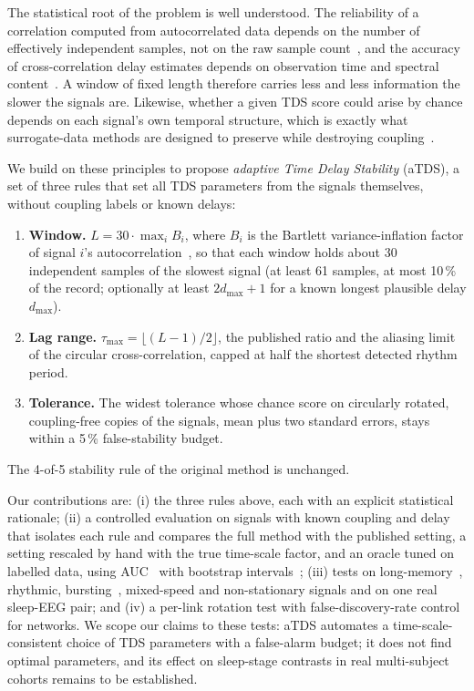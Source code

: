 \documentclass[11pt,a4paper]{article}
\begin{document}
The statistical root of the problem is well understood. The reliability of a correlation computed from autocorrelated data depends on the number of effectively independent samples, not on the raw sample count~\cite{Bartlett1946TheoreticalSpecification,Bayley1946EffectiveNumber,Pyper1998ComparisonMethods,Afyouni2019EffectiveDegrees}, and the accuracy of cross-correlation delay estimates depends on observation time and spectral content~\cite{Knapp1976GeneralizedCorrelation,Carter1987CoherenceTime}. A window of fixed length therefore carries less and less information the slower the signals are. Likewise, whether a given TDS score could arise by chance depends on each signal's own temporal structure, which is exactly what surrogate-data methods are designed to preserve while destroying coupling~\cite{Theiler1992TestingNonlinearity,Schreiber2000SurrogateTime,Lancaster2018SurrogateData}.

We build on these principles to propose \emph{adaptive Time Delay Stability} (aTDS), a set of three rules that set all TDS parameters from the signals themselves, without coupling labels or known delays:
\begin{enumerate}
\item \textbf{Window.} $L = 30 \cdot \max_i B_i$, where $B_i$ is the Bartlett variance-inflation factor of signal $i$'s autocorrelation~\cite{Bartlett1946TheoreticalSpecification}, so that each window holds about 30 independent samples of the slowest signal (at least 61 samples, at most 10\,\% of the record; optionally at least $2 d_{\max} + 1$ for a known longest plausible delay $d_{\max}$).
\item \textbf{Lag range.} $\tau_{\max} = \lfloor (L-1)/2 \rfloor$, the published ratio and the aliasing limit of the circular cross-correlation, capped at half the shortest detected rhythm period.
\item \textbf{Tolerance.} The widest tolerance whose chance score on circularly rotated, coupling-free copies of the signals, mean plus two standard errors, stays within a 5\,\% false-stability budget.
\end{enumerate}
The 4-of-5 stability rule of the original method is unchanged.

Our contributions are: (i) the three rules above, each with an explicit statistical rationale; (ii) a controlled evaluation on signals with known coupling and delay that isolates each rule and compares the full method with the published setting, a setting rescaled by hand with the true time-scale factor, and an oracle tuned on labelled data, using AUC~\cite{Hanley1982MeaningUse} with bootstrap intervals~\cite{Efron1979BootstrapMethods}; (iii) tests on long-memory~\cite{Davies1987TestsHurst,Peng1995QuantificationScaling}, rhythmic, bursting~\cite{Rulkov2002ModelingSpikingbursting}, mixed-speed and non-stationary signals and on one real sleep-EEG pair; and (iv) a per-link rotation test with false-discovery-rate control~\cite{Benjamini1995ControllingFalse} for networks. We scope our claims to these tests: aTDS automates a time-scale-consistent choice of TDS parameters with a false-alarm budget; it does not find optimal parameters, and its effect on sleep-stage contrasts in real multi-subject cohorts remains to be established.
\end{document}
